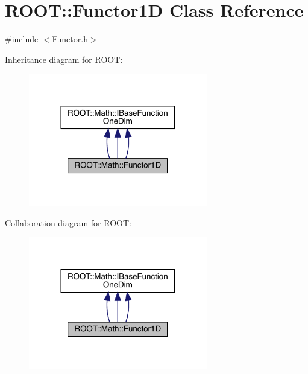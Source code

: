 \hypertarget{classROOT_1_1Math_1_1Functor1D}{}\section{R\+O\+OT\+:\+:Functor1D Class Reference}
\label{classROOT_1_1Math_1_1Functor1D}


{\ttfamily \#include $<$Functor.\+h$>$}



Inheritance diagram for R\+O\+OT\+:
\nopagebreak
\begin{figure}[H]
\begin{center}
\leavevmode
\includegraphics[width=221pt]{d9/d89/classROOT_1_1Math_1_1Functor1D__inherit__graph}
\end{center}
\end{figure}


Collaboration diagram for R\+O\+OT\+:
\nopagebreak
\begin{figure}[H]
\begin{center}
\leavevmode
\includegraphics[width=221pt]{d1/d6d/classROOT_1_1Math_1_1Functor1D__coll__graph}
\end{center}
\end{figure}

